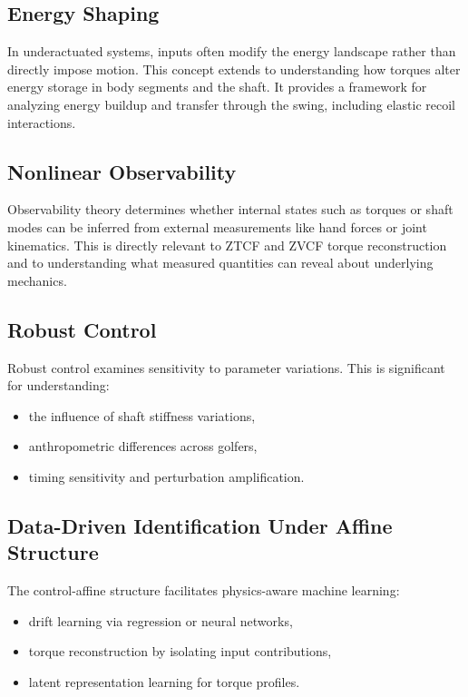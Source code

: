 \documentclass[12pt]{article}
\begin{document}
\subsection{Energy Shaping}

In underactuated systems, inputs often modify the energy landscape rather than directly impose motion. This concept extends to understanding how torques alter energy storage in body segments and the shaft. It provides a framework for analyzing energy buildup and transfer through the swing, including elastic recoil interactions.

\subsection{Nonlinear Observability}

Observability theory determines whether internal states such as torques or shaft modes can be inferred from external measurements like hand forces or joint kinematics. This is directly relevant to ZTCF and ZVCF torque reconstruction and to understanding what measured quantities can reveal about underlying mechanics.

\subsection{Robust Control}

Robust control examines sensitivity to parameter variations. This is significant for understanding:
\begin{itemize}
\item the influence of shaft stiffness variations,
\item anthropometric differences across golfers,
\item timing sensitivity and perturbation amplification.
\end{itemize}

\subsection{Data-Driven Identification Under Affine Structure}

The control-affine structure facilitates physics-aware machine learning:
\begin{itemize}
\item drift learning via regression or neural networks,
\item torque reconstruction by isolating input contributions,
\item latent representation learning for torque profiles.
\end{itemize}
\end{document}

